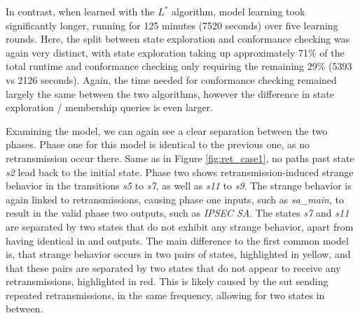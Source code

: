 In contrast, when learned with the $L^*$ algorithm, model learning took significantly longer, running for 125 minutes (7520 seconds) over five learning rounds. Here, the split between state exploration and conformance checking was again very distinct, with state exploration taking up approximately 71\% of the total runtime and conformance checking only requiring the remaining 29\% (5393 vs 2126 seconds). Again, the time needed for conformance checking remained largely the same between the two algorithms, however the difference in state exploration / membership queries is even larger.

Examining the model, we can again see a clear separation between the two phases. Phase one for this model is identical to the previous one, as no retransmission occur there. Same as in Figure \ref{fig:ret_case1}, no paths past state \emph{s2} lead back to the initial state. Phase two shows retransmission-induced strange behavior in the transitions \emph{s5} to \emph{s7}, as well as \emph{s11} to \emph{s9}. The strange behavior is again linked to retransmissions, causing phase one inputs, such as \emph{sa\_main}, to result in the valid phase two outputs, such as \emph{IPSEC SA}. The states \emph{s7} and \emph{s11} are separated by two states that do not exhibit any strange behavior, apart from having identical in and outputs. The main difference to the first common model is, that strange behavior occurs in two pairs of states, highlighted in yellow, and that these pairs are separated by two states that do not appear to receive any retransmissions, highlighted in red. This is likely caused by the \ac{sut} sending repeated retransmissions, in the same frequency, allowing for two states in between. 

